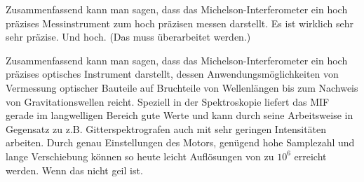 	Zusammenfassend kann man sagen, dass das Michelson-Interferometer ein hoch präzises Messinstrument zum hoch präzisen messen darstellt. Es ist wirklich sehr sehr präzise. Und hoch. (Das muss überarbeitet werden.)
	
	Zusammenfassend kann man sagen, dass das Michelson-Interferometer ein hoch präzises optisches Instrument darstellt, dessen Anwendungsmöglichkeiten von Vermessung optischer Bauteile auf Bruchteile von Wellenlängen bis zum Nachweis von Gravitationswellen reicht.
	Speziell in der Spektroskopie liefert das MIF gerade im langwelligen Bereich gute Werte und kann durch seine Arbeitsweise in Gegensatz zu z.B. Gitterspektrografen auch mit sehr geringen Intensitäten arbeiten.
	Durch genau Einstellungen des Motors, genügend hohe Samplezahl und lange Verschiebung können so heute leicht Auflösungen von zu $10^{6}$ erreicht werden.
	Wenn das nicht geil ist.
	  

